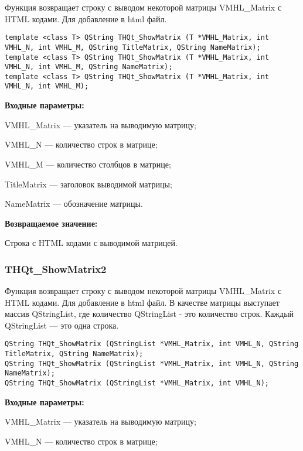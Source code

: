 \documentclass[a4paper,12pt]{article}
\begin{document}
Функция возвращает строку с выводом некоторой матрицы VMHL\_Matrix с HTML кодами. Для добавление в html файл.


\begin{lstlisting}[label=code_syntax_THQt_ShowMatrix,caption=Синтаксис]
template <class T> QString THQt_ShowMatrix (T *VMHL_Matrix, int VMHL_N, int VMHL_M, QString TitleMatrix, QString NameMatrix);
template <class T> QString THQt_ShowMatrix (T *VMHL_Matrix, int VMHL_N, int VMHL_M, QString NameMatrix);
template <class T> QString THQt_ShowMatrix (T *VMHL_Matrix, int VMHL_N, int VMHL_M);
\end{lstlisting}

\textbf{Входные параметры:}
 
    VMHL\_Matrix --- указатель на выводимую матрицу;
 
    VMHL\_N --- количество строк в матрице;
 
    VMHL\_M --- количество столбцов в матрице;
 
    TitleMatrix --- заголовок выводимой матрицы;
 
    NameMatrix --- обозначение матрицы.

\textbf{Возвращаемое значение:}

Строка с HTML кодами с выводимой матрицей.


\subsubsection{THQt\_ShowMatrix2}\label{THQt_ShowMatrix2}

Функция возвращает строку с выводом некоторой матрицы VMHL\_Matrix с HTML кодами. Для добавление в html файл. В качестве матрицы выступает массив QStringList, где количество QStringList - это количество строк. Каждый QStringList --- это одна строка.


\begin{lstlisting}[label=code_syntax_THQt_ShowMatrix2,caption=Синтаксис]
QString THQt_ShowMatrix (QStringList *VMHL_Matrix, int VMHL_N, QString TitleMatrix, QString NameMatrix);
QString THQt_ShowMatrix (QStringList *VMHL_Matrix, int VMHL_N, QString NameMatrix);
QString THQt_ShowMatrix (QStringList *VMHL_Matrix, int VMHL_N);
\end{lstlisting}

\textbf{Входные параметры:}

    VMHL\_Matrix --- указатель на выводимую матрицу;
 
    VMHL\_N --- количество строк в матрице;
 
\end{document}
